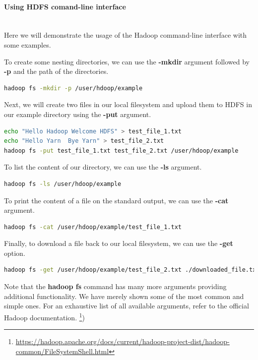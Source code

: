 \documentclass[12pt,english]{book}
\begin{document}
\paragraph{Using HDFS comand-line interface}\mbox{}\\

Here we will demonstrate the usage of the Hadoop command-line interface with some examples.

To create some nesting directories, we can use the \textbf{-mkdir} argument followed by \textbf{-p} and the path of the directories.

\begin{lstlisting}[language=bash, frame=single, basicstyle=\footnotesize]
hadoop fs -mkdir -p /user/hdoop/example
\end{lstlisting}

Next, we will create two files in our local filesystem and upload them to HDFS in our example directory using the \textbf{-put} argument.

\begin{lstlisting}[language=bash, frame=single, basicstyle=\footnotesize]
echo "Hello Hadoop Welcome HDFS" > test_file_1.txt
echo "Hello Yarn  Bye Yarn" > test_file_2.txt
hadoop fs -put test_file_1.txt test_file_2.txt /user/hdoop/example
\end{lstlisting}

To list the content of our directory, we can use the \textbf{-ls} argument.

\begin{lstlisting}[language=bash, frame=single, basicstyle=\footnotesize]
hadoop fs -ls /user/hdoop/example
\end{lstlisting}

To print the content of a file on the standard output, we can use the \textbf{-cat} argument.

\begin{lstlisting}[language=bash, frame=single, basicstyle=\footnotesize]
hadoop fs -cat /user/hdoop/example/test_file_1.txt
\end{lstlisting}

Finally, to download a file back to our local filesystem, we can use the \textbf{-get} option.

\begin{lstlisting}[language=bash, frame=single, basicstyle=\footnotesize]
hadoop fs -get /user/hdoop/example/test_file_2.txt ./downloaded_file.txt
\end{lstlisting}

Note that the \textbf{hadoop fs} command has many more arguments providing additional functionality.
We have merely shown some of the most common and simple ones.
For an exhaustive list of all available arguments, refer to the official Hadoop documentation. \footnote{\url{https://hadoop.apache.org/docs/current/hadoop-project-dist/hadoop-common/FileSystemShell.html}}) 
\end{document}
